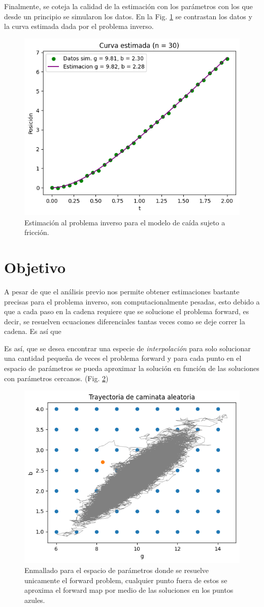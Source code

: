 \documentclass{article}
\begin{document}
Finalmente, se coteja la calidad de la estimación con los parámetros con los que desde un principio se simularon los datos. En la Fig. \ref{Fig. 3.05} se contrastan los datos y la curva estimada dada por el problema inverso.

\begin{figure}[H]
    \centering 
    \includegraphics[width = 8 cm]{Figures/estimacion.png} 
    \caption{Estimación al problema inverso para el modelo de caída sujeto a fricción.}
    \label{Fig. 3.05}
\end{figure} 


\section{Objetivo}

A pesar de que el análisis previo nos permite obtener estimaciones bastante precisas para el problema inverso, son computacionalmente pesadas, esto debido a que a cada paso en la cadena requiere que se solucione el problema forward, es decir, se resuelven ecuaciones diferenciales tantas veces como se deje correr la cadena. 
Es así que 


Es así, que se desea encontrar una especie de \textit{interpolación} para solo solucionar una cantidad pequeña de veces el problema forward y para cada punto en el espacio de parámetros se pueda aproximar la solución en función de las soluciones con parámetros cercanos. (Fig. \ref{Fig. 3.06})

\begin{figure}[H]
    \centering 
    \includegraphics[width = 8 cm]{Figures/interpolacion.png} 
    \caption{Enmallado para el espacio de parámetros donde se resuelve unicamente el forward problem, cualquier punto fuera de estos se aproxima el forward map por medio de las soluciones en los puntos azules.}
    \label{Fig. 3.06}
\end{figure} 
\end{document}
